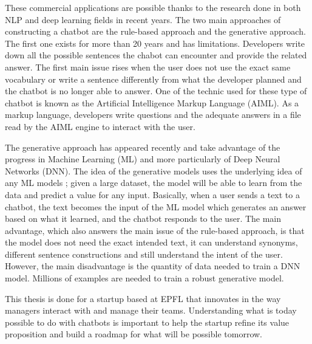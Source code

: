 These commercial applications are possible thanks to the research done in both NLP and deep learning fields in recent years. The two main approaches of constructing a chatbot are the rule-based approach and the generative approach. The first one exists for more than 20 years and has limitations. Developers write down all the possible sentences the chabot can encounter and provide the related answer. The first main issue rises when the user does not use the exact same vocabulary or write a sentence differently from what the developer planned and the chatbot is no longer able to answer.
One of the technic used for these type of chatbot is known as the Artificial Intelligence Markup Language (AIML). As a markup language, developers write questions and the adequate answers in a file read by the AIML engine to interact with the user.

The generative approach has appeared recently and take advantage of the progress in Machine Learning (ML) and more particularly of Deep Neural Networks (DNN). The idea of the generative models uses the underlying idea of any ML models ; given a large dataset, the model will be able to learn from the data and predict a value for any input.
Basically, when a user sends a text to a chatbot, the text becomes the input of the ML model which generates an answer based on what it learned, and the chatbot responds to the user. The main advantage, which also answers the main issue of the rule-based approach, is that the model does not need the exact intended text, it can understand synonyms, different sentence constructions and still understand the intent of the user. However, the main disadvantage is the quantity of data needed to train a DNN model. Millions of examples are needed to train a robust generative model.

This thesis is done for a startup based at EPFL that innovates in the way managers interact with and manage their teams.
Understanding what is today possible to do with chatbots is important to help the startup refine its value proposition and build a roadmap for what will be possible tomorrow.
